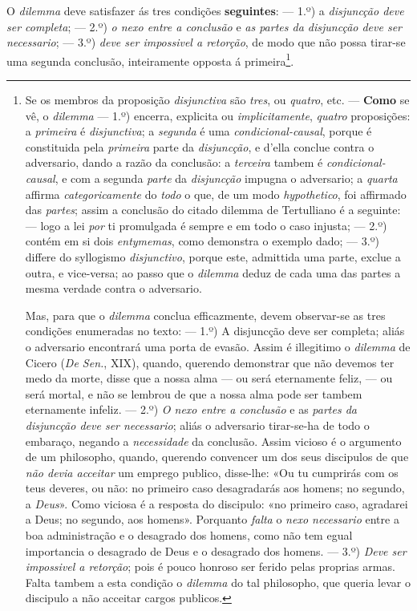 O \emph{dilemma} deve satisfazer ás tres condições \textbf{seguintes}: --- 1.º) a \emph{disjuncção deve ser completa}; --- 2.º) \emph{o nexo entre a conclusão} e \emph{as partes da disjuncção deve ser necessario}; --- 3.º) \emph{deve ser impossivel a retorção}, de modo que não possa tirar-se uma segunda conclusão, inteiramente opposta á primeira\footnote{Se os membros da proposição \emph{disjunctiva} são \emph{tres}, ou \emph{quatro}, etc. --- \textbf{Como} se vê, o \emph{dilemma} --- 1.º) encerra, explicita ou \emph{implicitamente}, \emph{quatro} proposições: a \emph{primeira} é \emph{disjunctiva}; a \emph{segunda} é uma \emph{condicional-causal}, porque é constituida pela \emph{primeira} parte da \emph{disjuncção}, e d'ella conclue contra o adversario, dando a razão da conclusão: a \emph{terceira} tambem é \emph{condicional-causal}, e com a segunda \emph{parte} da \emph{disjuncção} impugna o adversario; a \emph{quarta} affirma \emph{categoricamente} do \emph{todo} o que, de um modo \emph{hypothetico}, foi affirmado das \emph{partes}; assim a conclusão do citado dilemma de Tertulliano é a seguinte: --- logo a lei \emph{por} ti promulgada é sempre e em todo o caso injusta; --- 2.º) contém em si dois \emph{entymemas}, como demonstra o exemplo dado; --- 3.º) differe do syllogismo \emph{disjunctivo}, porque este, admittida uma parte, exclue a outra, e vice-versa; ao passo que o \emph{dilemma} deduz de cada uma das partes a mesma verdade contra o adversario.\par Mas, para que o \emph{dilemma} conclua efficazmente, devem observar-se as tres condições enumeradas no texto: --- 1.º) A disjuncção deve ser completa; aliás o adversario encontrará uma porta de evasão. Assim é illegitimo o \emph{dilemma} de Cicero (\emph{De Sen.}, XIX), quando, querendo demonstrar que não devemos ter medo da morte, disse que a nossa alma --- ou será eternamente feliz, --- ou será mortal, e não se lembrou de que a nossa alma pode ser tambem eternamente infeliz. --- 2.º) \emph{O nexo entre a conclusão} e as \emph{partes da disjuncção deve ser necessario}; aliás o adversario tirar-se-ha de todo o embaraço, negando a \emph{necessidade} da conclusão. Assim vicioso é o argumento de um philosopho, quando, querendo convencer um dos seus discipulos de que \emph{não devia acceitar} um emprego publico, disse-lhe: «Ou tu cumprirás com os teus deveres, ou não: no primeiro caso desagradarás aos homens; no segundo, a \emph{Deus}». Como viciosa é a resposta do discipulo: «no primeiro caso, agradarei a Deus; no segundo, aos homens». Porquanto \emph{falta} o \emph{nexo necessario} entre a boa administração e o desagrado dos homens, como não tem egual importancia o desagrado de Deus e o desagrado dos homens. --- 3.º) \emph{Deve ser impossivel a retorção}; pois é pouco honroso ser ferido pelas proprias armas. Falta tambem a esta condição o \emph{dilemma} do tal philosopho, que queria levar o discipulo a não acceitar cargos publicos.}.

